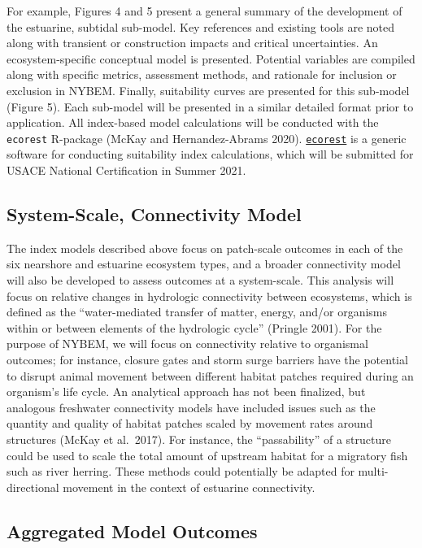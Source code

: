 \documentclass[
]{book}
\begin{document}
For example, Figures 4 and 5 present a general summary of the development of the estuarine, subtidal sub-model. Key references and existing tools are noted along with transient or construction impacts and critical uncertainties. An ecosystem-specific conceptual model is presented. Potential variables are compiled along with specific metrics, assessment methods, and rationale for inclusion or exclusion in NYBEM. Finally, suitability curves are presented for this sub-model (Figure 5). Each sub-model will be presented in a similar detailed format prior to application. All index-based model calculations will be conducted with the \texttt{ecorest} R-package (McKay and Hernandez-Abrams 2020). \href{https://cran.r-project.org/web/packages/ecorest/index.html}{\texttt{ecorest}} is a generic software for conducting suitability index calculations, which will be submitted for USACE National Certification in Summer 2021.

\hypertarget{system-scale-connectivity-model}{%
\subsection{System-Scale, Connectivity Model}\label{system-scale-connectivity-model}}

The index models described above focus on patch-scale outcomes in each of the six nearshore and estuarine ecosystem types, and a broader connectivity model will also be developed to assess outcomes at a system-scale. This analysis will focus on relative changes in hydrologic connectivity between ecosystems, which is defined as the ``water-mediated transfer of matter, energy, and/or organisms within or between elements of the hydrologic cycle'' (Pringle 2001). For the purpose of NYBEM, we will focus on connectivity relative to organismal outcomes; for instance, closure gates and storm surge barriers have the potential to disrupt animal movement between different habitat patches required during an organism's life cycle. An analytical approach has not been finalized, but analogous freshwater connectivity models have included issues such as the quantity and quality of habitat patches scaled by movement rates around structures (McKay et al.~2017). For instance, the ``passability'' of a structure could be used to scale the total amount of upstream habitat for a migratory fish such as river herring. These methods could potentially be adapted for multi-directional movement in the context of estuarine connectivity.

\hypertarget{aggregated-model-outcomes}{%
\subsection{Aggregated Model Outcomes}\label{aggregated-model-outcomes}}
\end{document}
